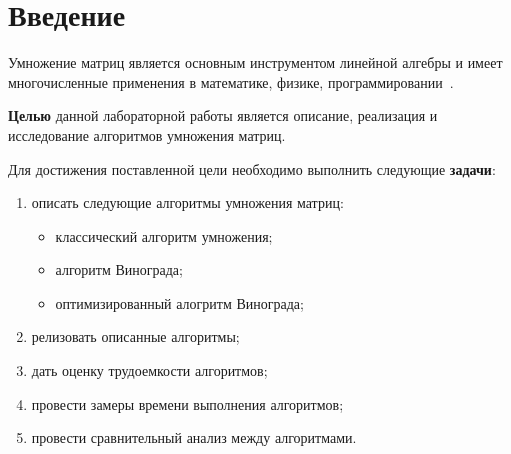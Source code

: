 \chapter*{Введение}

Умножение матриц является основным инструментом линейной алгебры и имеет многочисленные применения в математике, физике, программировании~\cite{vinograd-haskell}. 

\textbf{Целью} данной лабораторной работы является описание, реализация и исследование алгоритмов умножения матриц.

Для достижения поставленной цели необходимо выполнить следующие \textbf{задачи}:
\begin{enumerate}[label={\arabic*)}]
    \item описать следующие алгоритмы умножения матриц:
        \begin{itemize}
            \item классический алгоритм умножения;
            \item алгоритм Винограда;
            \item оптимизированный алогритм Винограда;
        \end{itemize}
    \item релизовать описанные алгоритмы;
    \item дать оценку трудоемкости алгоритмов;
    \item провести замеры времени выполнения алгоритмов;
    \item провести сравнительный анализ между алгоритмами.
\end{enumerate}